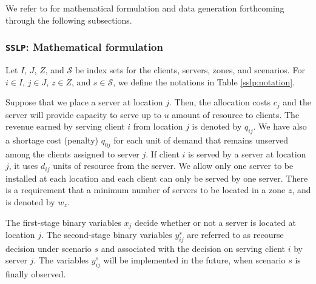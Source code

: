 We refer to \cite{journal:NS2005} for mathematical formulation and data generation forthcoming through the following subsections.


\subsubsection{\texttt{SSLP}: Mathematical formulation}
Let $I$, $J$, $Z$, and $\mathcal{S}$ be index sets for the clients, servers, zones, and scenarios. For $i\in I$, $j\in J$, $z\in Z$, and $s\in\mathcal{S}$, we define the notations in Table \ref{sslp:notation}.

Suppose that we place a server at location $j$. Then, the allocation costs $c_j$ and the server will provide capacity to serve up to $u$ amount of resource to clients. The revenue earned by serving client $i$ from location $j$ is denoted by $q_{ij}$. We have also a shortage cost (penalty) $q_{0j}$ for each unit of demand that remains unserved among the clients assigned to server $j$. If client $i$ is served by a server at location $j$, it uses $d_{ij}$ units of resource from the server. We allow only one server to be installed at each location and each client can only be served by one server. There is a requirement that a minimum number of servers to be located in a zone $z$, and is denoted by $w_z$. 

The first-stage binary variables $x_j$ decide whether or not a server is located at location $j$. The second-stage binary variables $y_{ij}^s$ are referred to as recourse decision under scenario $s$ and associated with the decision on serving client $i$ by server $j$. The variables $y_{ij}^s$ will be implemented in the future, when scenario $s$ is finally observed.

